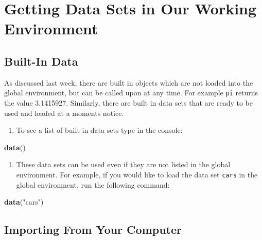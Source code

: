 \documentclass[
]{book}
\newenvironment{Shaded}{\begin{snugshade}}{\end{snugshade}}
\newcommand{\KeywordTok}[1]{\textcolor[rgb]{0.13,0.29,0.53}{\textbf{#1}}}
\newcommand{\NormalTok}[1]{#1}
\newcommand{\StringTok}[1]{\textcolor[rgb]{0.31,0.60,0.02}{#1}}
\providecommand{\tightlist}{%
  \setlength{\itemsep}{0pt}\setlength{\parskip}{0pt}}
\begin{document}
\hypertarget{LoadData}{%
\section{Getting Data Sets in Our Working Environment}\label{LoadData}}

\hypertarget{built-in-data}{%
\subsection*{Built-In Data}\label{built-in-data}}

As discussed last week, there are built in objects which are not loaded into the global environment, but can be called upon at any time. For example \texttt{pi} returns the value 3.1415927. Similarly, there are built in data sets that are ready to be used and loaded at a moments notice.

\begin{enumerate}
\def\labelenumi{\arabic{enumi})}
\tightlist
\item
  To see a list of built in data sets type in the console:
\end{enumerate}

\begin{Shaded}
\begin{Highlighting}[]
\KeywordTok{data}\NormalTok{()}
\end{Highlighting}
\end{Shaded}

\begin{enumerate}
\def\labelenumi{\arabic{enumi})}
\setcounter{enumi}{1}
\tightlist
\item
  These data sets can be used even if they are not listed in the global environment. For example, if you would like to load the data set \texttt{cars} in the global environment, run the following command:
\end{enumerate}

\begin{Shaded}
\begin{Highlighting}[]
\KeywordTok{data}\NormalTok{(}\StringTok{"cars"}\NormalTok{)}
\end{Highlighting}
\end{Shaded}

\hypertarget{importing-from-your-computer}{%
\subsection*{Importing From Your Computer}\label{importing-from-your-computer}}
\end{document}
